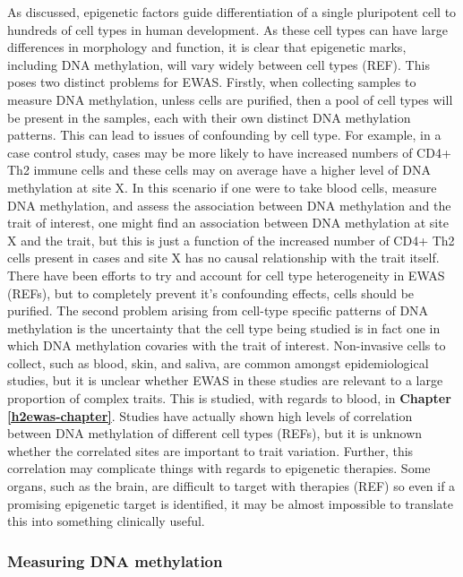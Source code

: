 \documentclass[11pt,twoside]{bristolthesis}
\begin{document}
As discussed, epigenetic factors guide differentiation of a single pluripotent cell to hundreds of cell types in human development. As these cell types can have large differences in morphology and function, it is clear that epigenetic marks, including DNA methylation, will vary widely between cell types (REF). This poses two distinct problems for EWAS. Firstly, when collecting samples to measure DNA methylation, unless cells are purified, then a pool of cell types will be present in the samples, each with their own distinct DNA methylation patterns. This can lead to issues of confounding by cell type. For example, in a case control study, cases may be more likely to have increased numbers of CD4+ Th2 immune cells and these cells may on average have a higher level of DNA methylation at site X. In this scenario if one were to take blood cells, measure DNA methylation, and assess the association between DNA methylation and the trait of interest, one might find an association between DNA methylation at site X and the trait, but this is just a function of the increased number of CD4+ Th2 cells present in cases and site X has no causal relationship with the trait itself. There have been efforts to try and account for cell type heterogeneity in EWAS (REFs), but to completely prevent it's confounding effects, cells should be purified. The second problem arising from cell-type specific patterns of DNA methylation is the uncertainty that the cell type being studied is in fact one in which DNA methylation covaries with the trait of interest. Non-invasive cells to collect, such as blood, skin, and saliva, are common amongst epidemiological studies, but it is unclear whether EWAS in these studies are relevant to a large proportion of complex traits. This is studied, with regards to blood, in \textbf{Chapter \ref{h2ewas-chapter}}. Studies have actually shown high levels of correlation between DNA methylation of different cell types (REFs), but it is unknown whether the correlated sites are important to trait variation. Further, this correlation may complicate things with regards to epigenetic therapies. Some organs, such as the brain, are difficult to target with therapies (REF) so even if a promising epigenetic target is identified, it may be almost impossible to translate this into something clinically useful.

\hypertarget{measuring-dna-methylation}{%
\subsubsection{Measuring DNA methylation}\label{measuring-dna-methylation}}
\end{document}

